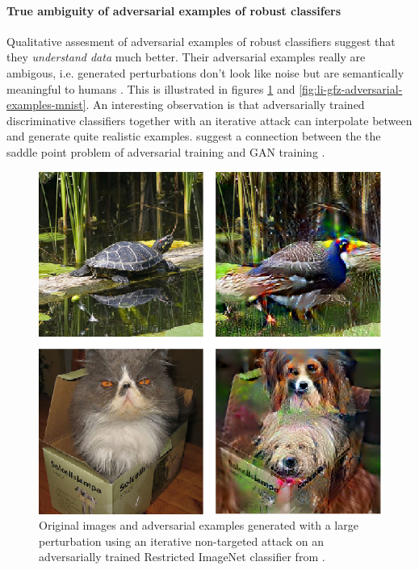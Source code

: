 \documentclass[oneside]{book}
\begin{document}

\paragraph{True ambiguity of adversarial examples of robust classifers}
Qualitative assesment of adversarial examples of robust classifiers suggest that they \textit{understand data} much better. Their adversarial examples really are ambigous, i.e. generated perturbations don't look like noise but are semantically meaningful to humans \citep{Tsipras:2018:RMBOA,Li:2019:AGCMRAA}.  This is illustrated in figures \ref{fig:tsipras-robust-adversarial-examples} and \ref{fig:li-gfz-adversarial-examples-mnist}. An interesting observation is that adversarially trained discriminative classifiers together with an iterative attack can interpolate between and generate quite realistic examples. \citet{Tsipras:2018:RMBOA} suggest a connection between the the saddle point problem of adversarial training and GAN training \citep{Goodfellow:2014:GAN}.

\begin{figure}[htbp!]
	\begin{center}
		\includegraphics[width=0.85\columnwidth]{figures/adversarial-examples/tsipras-turtle-bird-cat-dogs}
	\end{center}
	\caption{Original images and adversarial examples generated with a large perturbation using an iterative non-targeted attack on an adversarially trained Restricted ImageNet \citep{Tsipras:2018:RMBOA} classifier from \citet{Tsipras:2018:RMBOA}.}
	\label{fig:tsipras-robust-adversarial-examples}
\end{figure}
\end{document}
